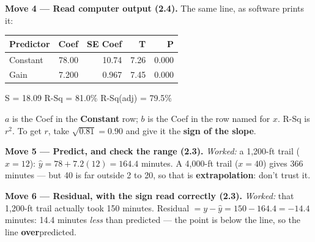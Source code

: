 \documentclass[12pt]{article}
\begin{document}
\vspace{3pt}
\textbf{Move 4 --- Read computer output (2.4).} The same line, as software prints it:
\par\vspace{3pt}
{\centering\footnotesize\ttfamily
\begin{tabular}{@{} l r r r r @{}}
Predictor & Coef & SE Coef & T & P \\ \hline
Constant & 78.00 & 10.74 & 7.26 & 0.000 \\
Gain & 7.200 & 0.967 & 7.45 & 0.000 \\
\end{tabular}\par
S = 18.09 \quad R-Sq = 81.0\% \quad R-Sq(adj) = 79.5\%\par}
\vspace{3pt}
$a$ is the Coef in the \textbf{Constant} row; $b$ is the Coef in the row named for $x$. R-Sq
is $r^2$. To get $r$, take $\sqrt{0.81} = 0.90$ and give it the \textbf{sign of the slope}.

\vspace{3pt}
\textbf{Move 5 --- Predict, and check the range (2.3).} \emph{Worked:} a 1{,}200-ft trail
($x = 12$): $\hat y = 78 + 7.2(12) = 164.4$ minutes. A 4{,}000-ft trail ($x = 40$) gives
366 minutes --- but 40 is far outside 2 to 20, so that is \textbf{extrapolation}: don't trust it.

\vspace{3pt}
\textbf{Move 6 --- Residual, with the sign read correctly (2.3).} \emph{Worked:} that
1{,}200-ft trail actually took 150 minutes. Residual $= y - \hat y = 150 - 164.4 = -14.4$
minutes: 14.4 minutes \emph{less} than predicted --- the point is below the line, so the line
\textbf{over}predicted.
\end{document}
